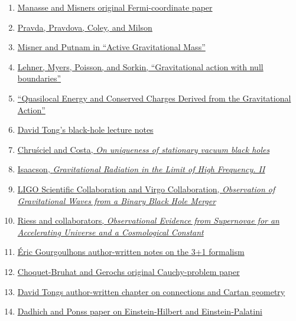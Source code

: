 \documentclass[
  11pt,
  letterpaper,
  oneside,
  openany]{scrbook}
\begin{document}
\begin{enumerate}
{  Tong\textquotesingle s general relativity notes}
\item
  \href{https://doi.org/10.1063/1.1724316}{Manasse and
  Misner\textquotesingle s original Fermi-coordinate paper}
\item
  \href{https://arxiv.org/abs/gr-qc/0209024}{Pravda, Pravdova, Coley,
  and Milson}
\item
  \href{https://link.aps.org/doi/10.1103/PhysRev.116.1045}{Misner and
  Putnam in ``Active Gravitational Mass''}
\item
  \href{https://arxiv.org/abs/1609.00207}{Lehner, Myers, Poisson, and
  Sorkin, ``Gravitational action with null boundaries''}
\item
  \href{https://arxiv.org/abs/gr-qc/9209012}{``Quasilocal Energy and
  Conserved Charges Derived from the Gravitational Action''}
\item
  \href{https://davidtong.org/pdfs/teaching/general-relativity/gr6.pdf}{David
  Tong's black-hole lecture notes}
\item
  \href{https://arxiv.org/abs/0806.0016}{Chruściel and Costa, \emph{On
  uniqueness of stationary vacuum black holes}}
\item
  \href{https://doi.org/10.1103/PhysRev.166.1272}{Isaacson,
  \emph{Gravitational Radiation in the Limit of High Frequency. II}}
\item
  \href{https://arxiv.org/abs/1602.03837}{LIGO Scientific Collaboration
  and Virgo Collaboration, \emph{Observation of Gravitational Waves from
  a Binary Black Hole Merger}}
\item
  \href{https://arxiv.org/abs/astro-ph/9805201}{Riess and collaborators,
  \emph{Observational Evidence from Supernovae for an Accelerating
  Universe and a Cosmological Constant}}
\item
  \href{https://arxiv.org/abs/gr-qc/0703035}{Éric
  Gourgoulhon\textquotesingle s author-written notes on the 3+1
  formalism}
\item
  \href{https://projecteuclid.org/journals/communications-in-mathematical-physics/volume-14/issue-4/Global-aspects-of-the-Cauchy-problem-in-general-relativity/cmp/1103841822.pdf}{Choquet-Bruhat
  and Geroch\textquotesingle s original Cauchy-problem paper}
\item
  \href{https://davidtong.org/teaching/general-relativity/grhtml/S3}{David
  Tong\textquotesingle s author-written chapter on connections and
  Cartan geometry}
\item
  \href{https://arxiv.org/abs/1010.0869}{Dadhich and
  Pons\textquotesingle s paper on Einstein-Hilbert and Einstein-Palatini
}
\end{enumerate}
\end{document}
